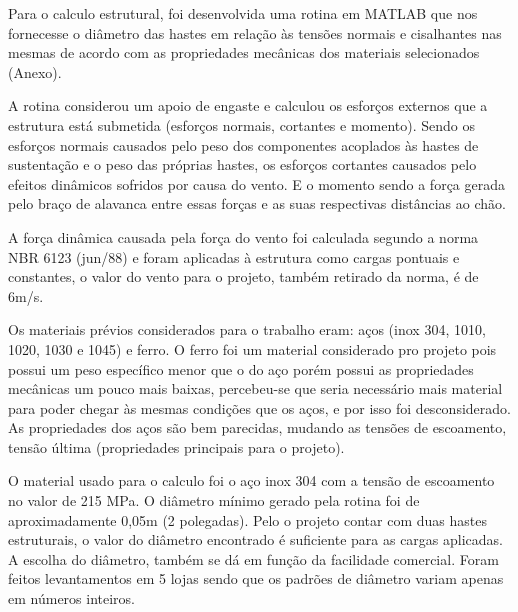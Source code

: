 Para o calculo estrutural, foi desenvolvida uma rotina em MATLAB que nos fornecesse o diâmetro das hastes em relação às tensões normais e cisalhantes nas mesmas de acordo com as propriedades mecânicas dos materiais selecionados (Anexo).

A rotina considerou um apoio de engaste e calculou os esforços externos que a estrutura está submetida (esforços normais, cortantes e momento). Sendo os esforços normais causados pelo peso dos componentes acoplados às hastes de sustentação e o peso das próprias hastes, os esforços cortantes causados pelo efeitos dinâmicos sofridos por causa do vento. E o momento sendo a força gerada pelo braço de alavanca entre essas forças e as suas respectivas distâncias ao chão.

A força dinâmica causada pela força do vento foi calculada segundo a norma NBR 6123 (jun/88) e foram aplicadas à estrutura como cargas pontuais e constantes, o valor do vento para o projeto, também retirado da norma, é de 6m/s.	

Os materiais prévios considerados para o trabalho eram: aços (inox 304, 1010, 1020, 1030 e 1045) e ferro. O ferro foi um material considerado pro projeto pois possui um peso específico menor que o do aço porém possui as propriedades mecânicas um pouco mais baixas, percebeu-se que seria necessário mais material para poder chegar às mesmas condições que os aços, e por isso foi desconsiderado. As propriedades dos aços são bem parecidas, mudando as tensões de escoamento, tensão última (propriedades principais para o projeto).
	
O material usado para o calculo foi o aço inox 304 com a tensão de escoamento no valor de 215 MPa. O diâmetro mínimo gerado pela rotina foi de aproximadamente 0,05m (2 polegadas). Pelo o projeto contar com duas hastes estruturais, o valor do diâmetro encontrado é suficiente para as cargas aplicadas. A escolha do diâmetro, também se dá em função da facilidade comercial. Foram feitos levantamentos em 5 lojas sendo que os padrões de diâmetro variam apenas em números inteiros.




